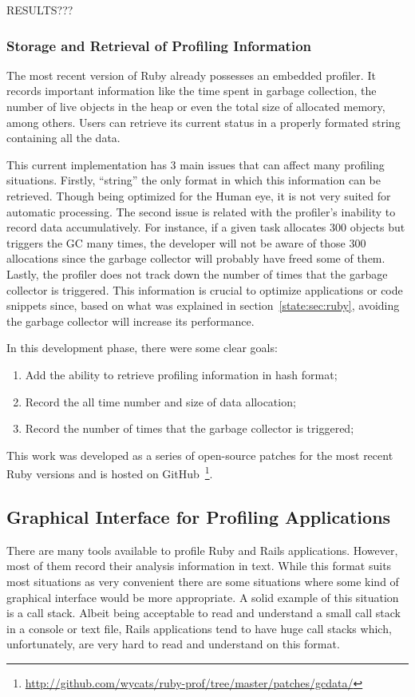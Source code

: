 RESULTS???

\subsubsection{Storage and Retrieval of Profiling Information}
The most recent version of Ruby already possesses an embedded profiler. It records important information like the time spent in garbage collection, the number of live objects in the heap or even the total size of allocated memory, among others. Users can retrieve its current status in a properly formated string containing all the data.

This current implementation has 3 main issues that can affect many profiling situations. Firstly, ``string'' the only format in which this information can be retrieved. Though being optimized for the Human eye, it is not very suited for automatic processing. The second issue is related with the profiler's inability to record data accumulatively. For instance, if a given task allocates 300 objects but triggers the GC many times, the developer will not be aware of those 300 allocations since the garbage collector will probably have freed some of them. Lastly, the profiler does not track down the number of times that the garbage collector is triggered. This information is crucial to optimize applications or code snippets since, based on what was explained in section~\ref{state:sec:ruby}, avoiding the garbage collector will increase its performance.

In this development phase, there were some clear goals:
\begin{enumerate}
  \item Add the ability to retrieve profiling information in hash format;
  \item Record the all time number and size of data allocation;
  \item Record the number of times that the garbage collector is triggered;
\end{enumerate}

This work was developed as a series of open-source patches for the most recent Ruby versions and is hosted on GitHub~\footnote{\url{http://github.com/wycats/ruby-prof/tree/master/patches/gcdata/}}.

\subsection{Graphical Interface for Profiling Applications}
There are many tools available to profile Ruby and Rails applications. However, most of them record their analysis information in text. While this format suits most situations as very convenient there are some situations where some kind of graphical interface would be more appropriate. A solid example of this situation is a call stack. Albeit being acceptable to read and understand a small call stack in a console or text file, Rails applications tend to have huge call stacks which, unfortunately, are very hard to read and understand on this format.

